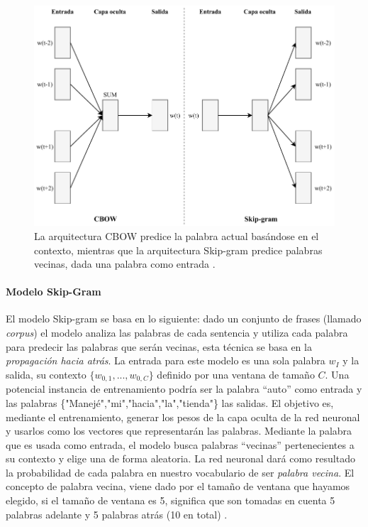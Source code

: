\begin{figure}[h!]
	\centering
	\includegraphics[width=0.7\linewidth]{7_marco_teorico/imagenes/cbow_skipgram.pdf}
	\caption{La arquitectura CBOW predice la palabra actual basándose en el contexto, mientras que la arquitectura Skip-gram predice palabras vecinas, dada una palabra como entrada \citep{mikolov2013efficient}.}
	\label{fig:cbowskipgram}
\end{figure}

\paragraph{Modelo Skip-Gram}
El modelo Skip-gram se basa en lo siguiente: dado un conjunto de frases (llamado \textit{corpus}) el modelo analiza las palabras de cada sentencia y utiliza cada palabra para predecir las palabras que serán vecinas, esta técnica se basa en la \textit{propagación hacia atrás}. La entrada para este modelo es una sola palabra \(w_I\) y la salida, su contexto \(\{w_{0,1},..., w_{0,C}\}\) definido por una ventana de tamaño \(C\). Una potencial instancia de entrenamiento podría ser la palabra “auto” como entrada y las palabras \{"Manejé","mi","hacia","la","tienda"\} las salidas. El objetivo es, mediante el entrenamiento, generar los pesos de la capa oculta de la red neuronal y usarlos como los vectores que representarán las palabras. Mediante la palabra que es usada como entrada, el modelo busca palabras “vecinas” pertenecientes a su contexto y elige una de forma aleatoria. La red neuronal dará como resultado la probabilidad de cada palabra en nuestro vocabulario de ser \textit{palabra vecina}. El concepto de palabra vecina, viene dado por el tamaño de ventana que hayamos elegido, si el tamaño de ventana es 5, significa que son tomadas en cuenta 5 palabras adelante y 5 palabras atrás (10 en total) \citep{skipgrammodel}.

